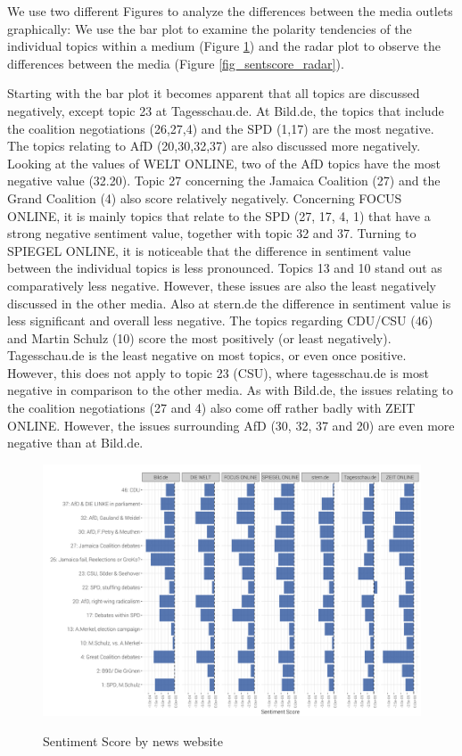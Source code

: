 \documentclass[12pt,a4paper,notitlepage]{article}
\begin{document}
We use two different Figures to analyze the differences between the media outlets graphically: We use the bar plot to examine the polarity tendencies of the individual topics within a medium (Figure \ref{fig_sentscore_site}) and the radar plot to observe the differences between the media (Figure \ref{fig_sentscore_radar}).

Starting with the bar plot it becomes apparent that all topics are discussed negatively, except topic 23 at Tagesschau.de. At Bild.de, the topics that include the coalition negotiations (26,27,4) and the SPD (1,17) are the most negative. The topics relating to AfD (20,30,32,37) are also discussed more negatively. Looking at the values of WELT ONLINE, two of the AfD topics have the most negative value (32.20). Topic 27 concerning the Jamaica Coalition (27) and the Grand Coalition (4) also score relatively negatively. Concerning FOCUS ONLINE, it is mainly topics that relate to the SPD (27, 17, 4, 1) that have a strong negative sentiment value, together with topic 32 and 37. Turning to SPIEGEL ONLINE, it is noticeable that the difference in sentiment value between the individual topics is less pronounced. Topics 13 and 10 stand out as comparatively less negative. However, these issues are also the least negatively discussed in the other media. Also at stern.de the difference in sentiment value is less significant and overall less negative. The topics regarding CDU/CSU (46) and Martin Schulz (10) score the most positively (or least negatively). Tagesschau.de is the least negative on most topics, or even once positive. However, this does not apply to topic 23 (CSU), where tagesschau.de is most negative in comparison to the other media. As with Bild.de, the issues relating to the coalition negotiations (27 and 4) also come off rather badly with ZEIT ONLINE. However, the issues surrounding AfD (30, 32, 37 and 20) are even more negative than at Bild.de. 

\begin{figure}[H]
	\caption{Sentiment Score by news website}
	\begin{center}
			\includegraphics[width=\textwidth,keepaspectratio]{../figs/sentscore_site.png}
			\label{fig_sentscore_site}
	\end{center}
\end{figure}
\end{document}
